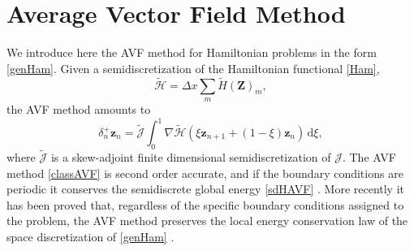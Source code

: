 \documentclass[twoside]{article}
\numberwithin{equation}{section}
\begin{document}
\section{Average Vector Field Method}\label{AVFsec}
We introduce here the AVF method for Hamiltonian problems in the form \eqref{genHam}.  
Given a semidiscretization of the Hamiltonian functional \eqref{Ham},
\begin{equation}\label{sdHAVF}
\widetilde{\mathcal{H}}=\Delta x\sum_m \widetilde{H}(\mathbf{Z})_m,
\end{equation}
the AVF method amounts to \cite{Quisp}
\begin{equation}\label{classAVF}
\delta_n^+\mathbf{z}_n=\widetilde{\mathcal{J}}\int_0^1\nabla \widetilde{\mathcal{H}}(\xi\mathbf{z}_{n+1}+(1-\xi)\mathbf{z}_n)\,\mathrm{d}\xi,
\end{equation}
where $\widetilde{\mathcal{J}}$ is a skew-adjoint finite dimensional semidiscretization of $\mathcal{J}$. The AVF method \eqref{classAVF} is second order accurate, and if the boundary conditions are periodic it conserves the semidiscrete global energy \eqref{sdHAVF} \cite{Celle}. More recently it has been proved that, regardless of the specific boundary conditions assigned to the problem, the AVF method preserves the local energy conservation law of the space discretization of \eqref{genHam} \cite{McLachlan,Frasca-Caccia2021}. 
\end{document}
